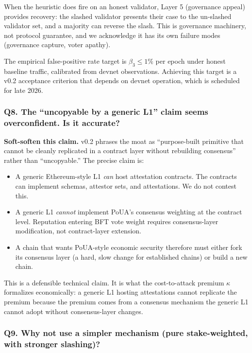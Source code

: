 \documentclass[
  11pt,
]{article}
\providecommand{\tightlist}{%
  \setlength{\itemsep}{0pt}\setlength{\parskip}{0pt}}
\begin{document}
When the heuristic does fire on an honest validator, Layer 5 (governance
appeal) provides recovery: the slashed validator presents their case to
the un-slashed validator set, and a majority can reverse the slash. This
is governance machinery, not protocol guarantee, and we acknowledge it
has its own failure modes (governance capture, voter apathy).

The empirical false-positive rate target is \(\beta_3 \leq 1\%\) per
epoch under honest baseline traffic, calibrated from devnet
observations. Achieving this target is a v0.2 acceptance criterion that
depends on devnet operation, which is scheduled for late 2026.

\subsubsection{Q8. The ``uncopyable by a generic L1'' claim seems
overconfident. Is it
accurate?}\label{q8.-the-uncopyable-by-a-generic-l1-claim-seems-overconfident.-is-it-accurate}

\textbf{Soft-soften this claim.} v0.2 phrases the moat as
``purpose-built primitive that cannot be cleanly replicated in a
contract layer without rebuilding consensus'' rather than
``uncopyable.'' The precise claim is:

\begin{itemize}
\tightlist
\item
  A generic Ethereum-style L1 \emph{can} host attestation contracts. The
  contracts can implement schemas, attestor sets, and attestations. We
  do not contest this.
\item
  A generic L1 \emph{cannot} implement PoUA's consensus weighting at the
  contract level. Reputation entering BFT vote weight requires
  consensus-layer modification, not contract-layer extension.
\item
  A chain that wants PoUA-style economic security therefore must either
  fork its consensus layer (a hard, slow change for established chains)
  or build a new chain.
\end{itemize}

This is a defensible technical claim. It is what the cost-to-attack
premium \(\kappa\) formalizes economically: a generic L1 hosting
attestations cannot replicate the premium because the premium comes from
a consensus mechanism the generic L1 cannot adopt without
consensus-layer changes.

\subsubsection{Q9. Why not use a simpler mechanism (pure stake-weighted,
with stronger
slashing)?}\label{q9.-why-not-use-a-simpler-mechanism-pure-stake-weighted-with-stronger-slashing}
\end{document}
